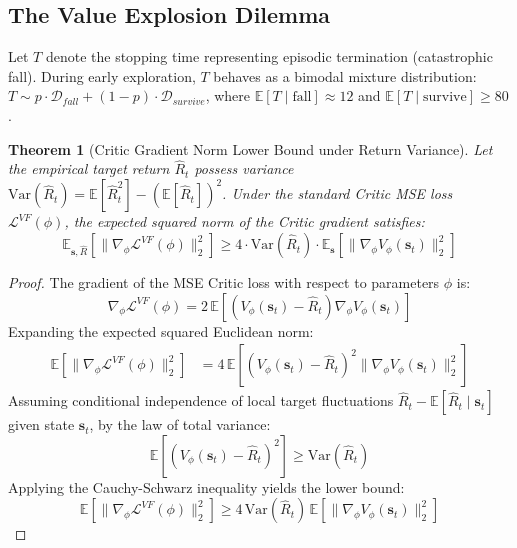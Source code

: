 \documentclass{article}
\newtheorem{theorem}{Theorem}
\begin{document}
\subsection{The Value Explosion Dilemma}
\label{subsec:explosion_proof}
Let $T$ denote the stopping time representing episodic termination (catastrophic fall). During early exploration, $T$ behaves as a bimodal mixture distribution: $T \sim p \cdot \mathcal{D}_{fall} + (1-p) \cdot \mathcal{D}_{survive}$, where $\mathbb{E}[T \mid \text{fall}] \approx 12$ and $\mathbb{E}[T \mid \text{survive}] \ge 80$.

\begin{theorem}[Critic Gradient Norm Lower Bound under Return Variance]
\label{thm:gradient_explosion}
Let the empirical target return $\hat{R}_t$ possess variance $\text{Var}(\hat{R}_t) = \mathbb{E}[\hat{R}_t^2] - (\mathbb{E}[\hat{R}_t])^2$. Under the standard Critic MSE loss $\mathcal{L}^{VF}(\phi)$, the expected squared norm of the Critic gradient satisfies:
\begin{equation}
\mathbb{E}_{\mathbf{s}, \hat{R}} \left[ \|\nabla_\phi \mathcal{L}^{VF}(\phi)\|_2^2 \right] \ge 4 \cdot \text{Var}(\hat{R}_t) \cdot \mathbb{E}_{\mathbf{s}} \left[ \|\nabla_\phi V_\phi(\mathbf{s}_t)\|_2^2 \right]
\end{equation}
\end{theorem}

\begin{proof}
The gradient of the MSE Critic loss with respect to parameters $\phi$ is:
\begin{equation}
\nabla_\phi \mathcal{L}^{VF}(\phi) = 2 \, \mathbb{E} \left[ \left( V_\phi(\mathbf{s}_t) - \hat{R}_t \right) \nabla_\phi V_\phi(\mathbf{s}_t) \right]
\end{equation}
Expanding the expected squared Euclidean norm:
\begin{align}
\mathbb{E} \left[ \|\nabla_\phi \mathcal{L}^{VF}(\phi)\|_2^2 \right] &= 4 \, \mathbb{E} \left[ \left( V_\phi(\mathbf{s}_t) - \hat{R}_t \right)^2 \|\nabla_\phi V_\phi(\mathbf{s}_t)\|_2^2 \right]
\end{align}
Assuming conditional independence of local target fluctuations $\hat{R}_t - \mathbb{E}[\hat{R}_t \mid \mathbf{s}_t]$ given state $\mathbf{s}_t$, by the law of total variance:
\begin{equation}
\mathbb{E} \left[ (V_\phi(\mathbf{s}_t) - \hat{R}_t)^2 \right] \ge \text{Var}(\hat{R}_t)
\end{equation}
Applying the Cauchy-Schwarz inequality yields the lower bound:
\begin{equation}
\mathbb{E} \left[ \|\nabla_\phi \mathcal{L}^{VF}(\phi)\|_2^2 \right] \ge 4 \, \text{Var}(\hat{R}_t) \, \mathbb{E} \left[ \|\nabla_\phi V_\phi(\mathbf{s}_t)\|_2^2 \right]
\end{equation}
\end{proof}
\end{document}
